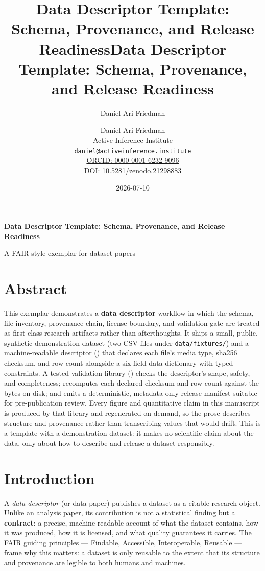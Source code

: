 \documentclass[
]{article}
\title{Data Descriptor Template: Schema, Provenance, and Release
Readiness}
\author{Daniel Ari Friedman}
\date{}
\title{Data Descriptor Template: Schema, Provenance, and Release Readiness}
\author{Daniel Ari Friedman\\\footnotesize{Active Inference Institute}\\\footnotesize{\texttt{daniel@activeinference.institute}}\\\footnotesize{\href{https://orcid.org/0000-0001-6232-9096}{ORCID: 0000-0001-6232-9096}} \\ \footnotesize{DOI: \href{https://doi.org/10.5281/zenodo.21298883}{10.5281/zenodo.21298883}}}
\date{2026-07-10}
\begin{document}
\begin{titlepage}
\centering
\vspace*{2cm}
{\LARGE\bfseries Data Descriptor Template: Schema, Provenance, and Release Readiness\par}
\vspace{0.75em}
{\large A FAIR-style exemplar for dataset papers\par}
\vfill
\makeatletter
{\@author\par}
\vspace{1em}
{\@date\par}
\makeatother
\vfill
\end{titlepage}
\thispagestyle{empty}
\tableofcontents
\newpage

\section{Abstract}\label{abstract}

This exemplar demonstrates a \textbf{data descriptor} workflow in which
the schema, file inventory, provenance chain, license boundary, and
validation gate are treated as first-class research artifacts rather
than afterthoughts. It ships a small, public, synthetic demonstration
dataset (two CSV files under \texttt{data/fixtures/}) and a
machine-readable descriptor ()
that declares each file's media type, sha256 checksum, and row count
alongside a six-field data dictionary with typed constraints. A tested
validation library () checks the
descriptor's shape, safety, and completeness; recomputes each declared
checksum and row count against the bytes on disk; and emits a
deterministic, metadata-only release manifest suitable for
pre-publication review. Every figure and quantitative claim in this
manuscript is produced by that library and regenerated on demand, so the
prose describes structure and provenance rather than transcribing values
that would drift. This is a template with a demonstration dataset: it
makes no scientific claim about the data, only about how to describe and
release a dataset responsibly.

\newpage

\section{Introduction}\label{sec:introduction}

A \emph{data descriptor} (or data paper) publishes a dataset as a
citable research object. Unlike an analysis paper, its contribution is
not a statistical finding but a \textbf{contract}: a precise,
machine-readable account of what the dataset contains, how it was
produced, how it is licensed, and what quality guarantees it carries.
The FAIR guiding principles --- Findable, Accessible, Interoperable,
Reusable \citep{wilkinson2016fair} --- frame why this matters: a dataset
is only reusable to the extent that its structure and provenance are
legible to both humans and machines.
\end{document}
